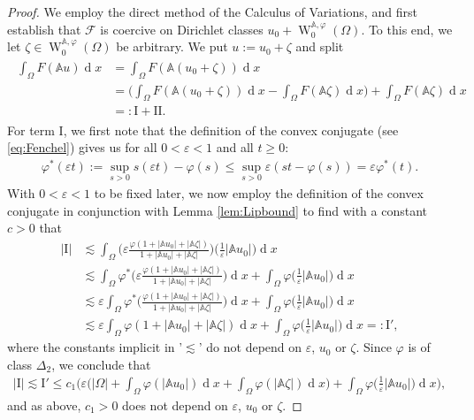 \documentclass[a4paper,11pt]{amsart}
\numberwithin{equation}{section}
\newcommand{\dif}{\operatorname{d}\!}
\newcommand{\sobo}{\operatorname{W}}
\begin{document}
	\begin{proof} We employ the direct method of the Calculus of Variations, and first establish that $\mathcal{F}$ is coercive on Dirichlet classes $u_{0}+\sobo_{0}^{\mathbb{A},\varphi}(\Omega)$. To this end, we let $\zeta\in\sobo_{0}^{\mathbb{A},\varphi}(\Omega)$ be arbitrary. We put $u:=u_{0}+\zeta$ and split 
		\begin{align}\label{eq:Paulsplit}
			\begin{split}
				\int_{\Omega}F(\mathbb{A}u)\dif x & = 
				\int_{\Omega}F(\mathbb{A}(u_{0}+\zeta))\dif x \\ & = \Big(\int_{\Omega}F(\mathbb{A}(u_{0}+\zeta))\dif x - \int_{\Omega}F(\mathbb{A}\zeta)\dif x\Big) + \int_{\Omega}F(\mathbb{A}\zeta)\dif x \\ & =: \mathrm{I} + \mathrm{II}.
			\end{split}
		\end{align}
		For term $\mathrm{I}$, we first note that the definition of the convex conjugate (see \eqref{eq:Fenchel}) gives us for all $0<\varepsilon<1$ and all $t\geq 0$: 
		\begin{align}\label{eq:phi*bound}
			\varphi^{*}(\varepsilon t) := \sup_{s>0}s(\varepsilon t) - \varphi(s) \leq \sup_{s>0}\varepsilon(st - \varphi(s)) = \varepsilon \varphi^{*}(t).
		\end{align}
		With $0<\varepsilon<1$ to be fixed later, we now employ the definition of the convex conjugate in conjunction with Lemma \ref{lem:Lipbound} to find with a constant $c>0$ that 
		\begin{align*}
			|\mathrm{I}| & \lesssim  \int_{\Omega} \Big(\varepsilon\frac{\varphi(1+|\mathbb{A}u_{0}|+|\mathbb{A}\zeta|)}{1+|\mathbb{A}u_{0}|+|\mathbb{A}\zeta|}\Big) \Big(\frac{1}{\varepsilon}|\mathbb{A}u_{0}|\Big)\dif x \\ 
			& \lesssim  \int_{\Omega} \varphi^{*}\Big(\varepsilon\frac{\varphi(1+|\mathbb{A}u_{0}|+|\mathbb{A}\zeta|)}{1+|\mathbb{A}u_{0}|+|\mathbb{A}\zeta|}\Big)\dif x + \int_{\Omega}\varphi \Big(\frac{1}{\varepsilon}|\mathbb{A}u_{0}|\Big)\dif x \\ 
			& \lesssim  \varepsilon\int_{\Omega} \varphi^{*}\Big(\frac{\varphi(1+|\mathbb{A}u_{0}|+|\mathbb{A}\zeta|)}{1+|\mathbb{A}u_{0}|+|\mathbb{A}\zeta|}\Big)\dif x + \int_{\Omega}\varphi \Big(\frac{1}{\varepsilon}|\mathbb{A}u_{0}|\Big)\dif x \\ 
			& \lesssim  \varepsilon\int_{\Omega} \varphi(1+|\mathbb{A}u_{0}|+|\mathbb{A}\zeta|)\dif x + \int_{\Omega}\varphi \Big(\frac{1}{\varepsilon}|\mathbb{A}u_{0}|\Big)\dif x =: \mathrm{I}', 
		\end{align*}
		where the constants implicit in '$\lesssim$' do not depend on $\varepsilon$, $u_{0}$ or $\zeta$. Since $\varphi$ is of class $\Delta_{2}$, we conclude that 
		\begin{align}\label{eq:ultimo}
			|\mathrm{I}| \lesssim \mathrm{I}' \leq c_{1}\Big( \varepsilon\Big(|\Omega| + \int_{\Omega}\varphi(|\mathbb{A}u_{0}|)\dif x + \int_{\Omega}\varphi(|\mathbb{A}\zeta|)\dif x \Big) + \int_{\Omega}\varphi \Big(\frac{1}{\varepsilon}|\mathbb{A}u_{0}|\Big)\dif x\Big),  
		\end{align} 
		and as above, $c_{1}>0$ does not depend on $\varepsilon$, $u_{0}$ or $\zeta$.
		

\end{proof}
\end{document}
